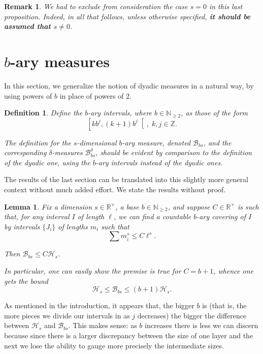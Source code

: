 \documentclass[11pt, reqno]{amsart}
\newcommand{\R}{\mathbb{R}}
\newcommand{\Z}{\mathbb{Z}}
\newcommand{\N}{\mathbb{N}}
\newcommand{\HH}{\mathcal{H}}
\newcommand{\BB}{\mathcal{B}}
\newtheorem{lemma}{Lemma}
\newtheorem{definition}{Definition}
\newtheorem{remark}{Remark}
\begin{document}
\begin{remark} \label{dimnotzero}
We had to exclude from consideration the case $s = 0$ in this last proposition. Indeed, in all that follows, unless otherwise specified, \textbf{it should be assumed that $s \neq 0$}.
\end{remark}

\section{$b$-ary measures}\label{sectgenbmeasures}

In this section, we generalize the notion of dyadic measures in a natural way, by using powers of $b$ in place of powers of 2.

\begin{definition}
Define the $b$-ary intervals, where $b \in \N_{\geq 2}$, as those of the form
\[\left[k b^j, (k+1) b^j \right[, \;k, j \in \Z.\]

The definition for the $s$-dimensional $b$-ary measure, denoted $\BB_{bs}$, and the corresponding $\delta$-measures $\BB_{bs}^\delta$, should be evident by comparison to the definition of the dyadic one, using the $b$-ary intervals instead of the dyadic ones.
\end{definition}

The results of the last section can be translated into this slightly more general context without much added effort. We state the results without proof.

\begin{lemma}
Fix a dimension $s \in \R^+$, a base $b \in \N_{\geq 2}$, and suppose $C \in \R^+$ is such that, for any interval $I$ of length $\ell$, we can find a countable $b$-ary covering of $I$ by intervals $\{J_i\}$ of lengths $m_i$ such that
\[\sum m_i^s \leq C \ell^s.\]

Then $\BB_{bs} \leq C \HH_s$.

In particular, one can easily show the premise is true for $C = b+1$, whence one gets the bound
\[\HH_s \leq \BB_{bs} \leq (b+1) \HH_s.\]
\end{lemma}

As mentioned in the introduction, it appears that, the bigger $b$ is (that is, the more pieces we divide our intervals in as $j$ decreases) the bigger the difference between $\HH_s$ and $\BB_{bs}$. This makes sense: as $b$ increases there is less we can discern because since there is a larger discrepancy between the size of one layer and the next we lose the ability to gauge more precisely the intermediate sizes.
\end{document}

